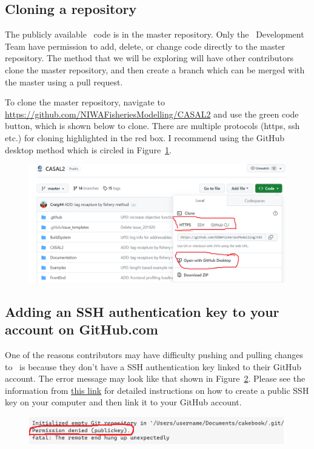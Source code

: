 \subsection{Cloning a repository}

The publicly available \CNAME\ code is in the master repository. Only the \CNAME\ Development Team have permission to add, delete, or change code directly to the master repository. The method that we will be exploring will have other contributors clone the master repository, and then create a branch which can be merged with the master using a pull request.

To clone the master repository, navigate to \url{https://github.com/NIWAFisheriesModelling/CASAL2} and use the green code button, which is shown below to clone. There are multiple protocols (https, ssh etc.) for cloning highlighted in the red box. I recommend using the GitHub desktop method which is circled in Figure~\ref{fig:clone}.

\begin{figure}[!ht]
	\centering
	\includegraphics[scale=0.6]{Figures/clone_repo.png}
	\caption{}\label{fig:clone}
\end{figure}


\subsection{Adding an SSH authentication key to your account on GitHub.com}

One of the reasons contributors may have difficulty pushing and pulling changes to \CNAME\ is because they don't have a SSH authentication key linked to their GitHub account. The error message may look like that shown in Figure~\ref{fig:permissiondenied}. Please see the information from \href{https://docs.github.com/en/authentication/connecting-to-github-with-ssh/adding-a-new-ssh-key-to-your-github-account}{this link} for detailed instructions on how to create a public SSH key on your computer and then link it to your GitHub account.

\begin{figure}[!ht]
	\centering
	\includegraphics[scale=0.6]{Figures/permissiondenied.png}
	\caption{}\label{fig:permissiondenied}
\end{figure}
